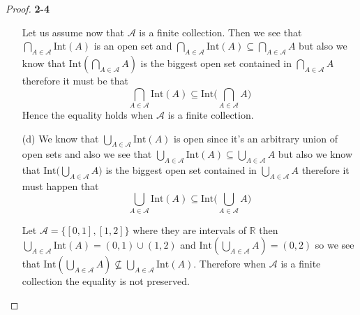 \documentclass[11pt]{article}
\newcommand{\R}{\mathbb{R}}
\newcommand{\inter}{\text{Int}}
\theoremstyle{definition}
\begin{document}
\begin{proof}{\textbf{2-4}}
\begin{itemize}
    Let us assume now that $\mathcal{A}$ is a finite collection. Then we see
    that $\bigcap_{A \in \mathcal{A}} \inter(A)$ is an open set and
    $\bigcap_{A \in \mathcal{A}} \inter(A) \subseteq \bigcap_{A \in \mathcal{A}} A$
    but also we know that $\inter(\bigcap_{A \in \mathcal{A}} A)$ is the
    biggest open set contained in $\bigcap_{A \in \mathcal{A}} A$ therefore
    it must be that 
    $$\bigcap_{A \in \mathcal{A}} \inter(A)
    \subseteq \inter\bigg(\bigcap_{A \in \mathcal{A}} A\bigg)$$
    Hence the equality holds when $\mathcal{A}$ is a finite collection.
\cleardoublepage
    \item [(d)] We know that $\bigcup_{A \in \mathcal{A}} \inter(A)$ is open
    since it's an arbitrary union of open sets and also we see that
    $\bigcup_{A \in \mathcal{A}} \inter(A)
    \subseteq  \bigcup_{A \in \mathcal{A}} A$ but also we know that
    $\inter\bigg(\bigcup_{A \in \mathcal{A}} A\bigg)$ is the biggest open set
    contained in $\bigcup_{A \in \mathcal{A}} A$ therefore it must happen that
    $$\bigcup_{A \in \mathcal{A}} \inter(A)
    \subseteq \inter\bigg(\bigcup_{A \in \mathcal{A}} A\bigg)$$

    Let $\mathcal{A} = \{[0,1], [1, 2]\}$ where they are intervals of $\R$ then
    $\bigcup_{A \in \mathcal{A}} \inter(A) = (0,1) \cup (1,2)$ and
    $\inter(\bigcup_{A \in \mathcal{A}} A) = (0,2)$ so we see that
    $\inter(\bigcup_{A \in \mathcal{A}} A)
    \not\subseteq \bigcup_{A \in \mathcal{A}} \inter(A)$. Therefore when
    $\mathcal{A}$ is a finite collection the equality is not preserved.
    \end{itemize}
\end{proof}
\end{document}
